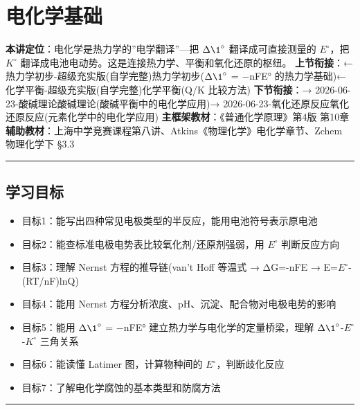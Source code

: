 \section{电化学基础}\label{ux7535ux5316ux5b66ux57faux7840}

\textbf{本讲定位}：电化学是热力学的''电学翻译''---把 \(\Delta \1^{\circ}\) 翻译成可直接测量的 \(E^{\circ}\)，把 \(K^{\circ}\) 翻译成电池电动势。这是连接热力学、平衡和氧化还原的枢纽。
\textbf{上节衔接}：← 热力学初步-超级充实版(自学完整)\textbar 热力学初步(\(\Delta \1^{\circ}\) = −nFE° 的热力学基础)← 化学平衡-超级充实版(自学完整)\textbar 化学平衡(Q/K 比较方法)
\textbf{下节衔接}：→ 2026-06-23-酸碱理论\textbar 酸碱理论(酸碱平衡中的电化学应用)→ 2026-06-23-氧化还原反应\textbar 氧化还原反应(元素化学中的电化学应用)
\textbf{主框架教材}：《普通化学原理》第4版 第10章
\textbf{辅助教材}：上海中学竞赛课程第八讲、Atkins《物理化学》电化学章节、Zchem 物理化学下 §3.3

\begin{center}\rule{0.5\linewidth}{0.5pt}\end{center}

\subsection{学习目标}\label{ux5b66ux4e60ux76eeux6807}

\begin{itemize}
\tightlist
\item
  目标1：能写出四种常见电极类型的半反应，能用电池符号表示原电池
\item
  目标2：能查标准电极电势表比较氧化剂/还原剂强弱，用 \(E^{\circ}\) 判断反应方向
\item
  目标3：理解 Nernst 方程的推导链(van't Hoff 等温式 → ΔG=-nFE → E=\(E^{\circ}\)-(RT/nF)lnQ)
\item
  目标4：能用 Nernst 方程分析浓度、pH、沉淀、配合物对电极电势的影响
\item
  目标5：能用 \(\Delta \1^{\circ}\) = −nFE° 建立热力学与电化学的定量桥梁，理解 \(\Delta \1^{\circ}\)-\(E^{\circ}\)-\(K^{\circ}\) 三角关系
\item
  目标6：能读懂 Latimer 图，计算物种间的 \(E^{\circ}\)，判断歧化反应
\item
  目标7：了解电化学腐蚀的基本类型和防腐方法
\end{itemize}

\begin{center}\rule{0.5\linewidth}{0.5pt}\end{center}

